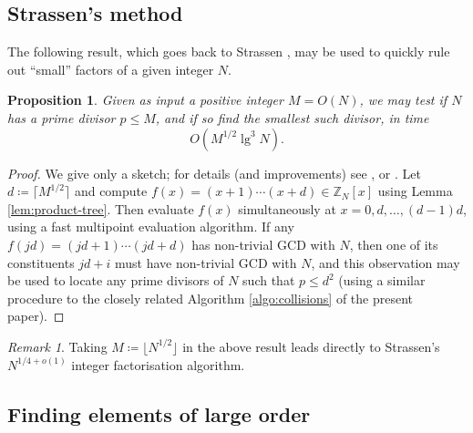 \documentclass[reqno]{amsart}
\newtheorem{prop}[thm]{Proposition}
\theoremstyle{remark}
\newtheorem{rem}[thm]{Remark}
\numberwithin{equation}{section}
\numberwithin{thm}{section}
\newcommand{\ZZ}{\mathbb{Z}}
\renewcommand{\leq}{\leqslant}
\newcommand{\defeq}{\coloneqq}
\begin{document}
\subsection{Strassen's method}

The following result,
which goes back to Strassen \cite{Str-factoring},
may be used to quickly rule out ``small'' factors of a given integer $N$.
\begin{prop}
\label{prop:small-factors}
  Given as input a positive integer $M = O(N)$,
  we may test if $N$ has a prime divisor $p \leq M$,
  and if so find the smallest such divisor,
  in time
    \[ O(M^{1/2} \lg^3 N). \]
\end{prop}
\begin{proof}
  We give only a sketch; for details (and improvements) see
  \cite{Str-factoring}, \cite{BGS-recurrences} or \cite{CH-factor}.
  Let $d \defeq \lceil M^{1/2} \rceil$
  and compute $f(x) = (x+1) \cdots (x+d) \in \ZZ_N[x]$
  using Lemma \ref{lem:product-tree}.
  Then evaluate $f(x)$ simultaneously at $x = 0, d, \ldots, (d-1)d$,
  using a fast multipoint evaluation algorithm.
  If any $f(jd) = (jd+1)\cdots(jd+d)$ has non-trivial GCD with $N$,
  then one of its constituents $jd + i$ must have non-trivial GCD with $N$,
  and this observation may be used to locate any prime divisors of $N$
  such that $p \leq d^2$
  (using a similar procedure to the closely related
  Algorithm \ref{algo:collisions} of the present paper).
\end{proof}
\begin{rem}
  Taking $M \defeq \lfloor N^{1/2} \rfloor$ in the above result leads
  directly to Strassen's $N^{1/4+o(1)}$ integer factorisation algorithm.
\end{rem}


\subsection{Finding elements of large order}
\end{document}
